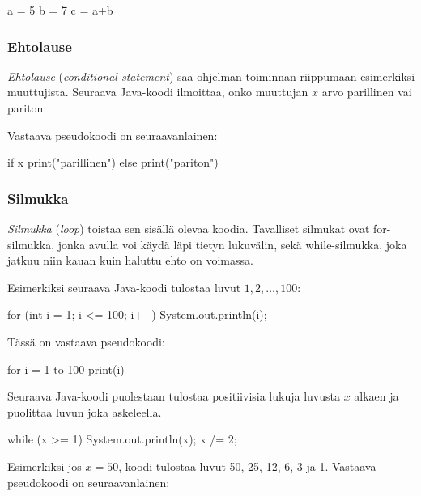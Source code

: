 \begin{code}
a = 5
b = 7
c = a+b
\end{code}

\subsubsection{Ehtolause}

\emph{Ehtolause} (\emph{conditional statement}) saa ohjelman
toiminnan riippumaan esimerkiksi muuttujista.
Seuraava Java-koodi ilmoittaa, onko muuttujan $x$ arvo parillinen vai pariton:


Vastaava pseudokoodi on seuraavanlainen:

\begin{code}
if x%
    print("parillinen")
else
    print("pariton")
\end{code}

\subsubsection{Silmukka}

\emph{Silmukka} (\emph{loop}) toistaa sen sisällä olevaa koodia.
Tavalliset silmukat ovat for-silmukka,
jonka avulla voi käydä läpi tietyn lukuvälin,
sekä while-silmukka,
joka jatkuu niin kauan kuin haluttu ehto on voimassa.

Esimerkiksi seuraava Java-koodi tulostaa luvut $1,2,\dots,100$:

\begin{code}
for (int i = 1; i <= 100; i++) {
    System.out.println(i);
}
\end{code}

Tässä on vastaava pseudokoodi:

\begin{code}
for i = 1 to 100
    print(i)
\end{code}

Seuraava Java-koodi puolestaan tulostaa positiivisia lukuja luvusta $x$ alkaen
ja puolittaa luvun joka askeleella.

\begin{code}
while (x >= 1) {
    System.out.println(x);
    x /= 2;
}
\end{code}

Esimerkiksi jos $x=50$, koodi tulostaa luvut 50, 25, 12, 6, 3 ja 1.
Vastaava pseudokoodi on seuraavanlainen:

